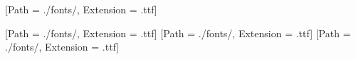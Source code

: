 









[Path = ./fonts/, Extension = .ttf]
\newcommand{\jcztext}[1]{{\jcz #1}}

[Path = ./fonts/, Extension = .ttf]
\newCJKfontfamily{}[Path = ./fonts/, Extension = .ttf]
[Path = ./fonts/, Extension = .ttf]



\usepackage{ruby}





